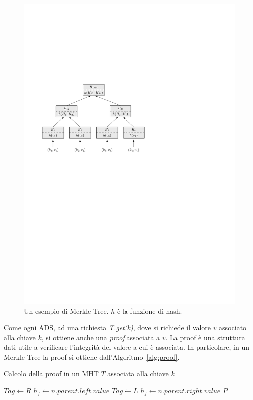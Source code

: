 \begin{figure}
	\centering
	\includegraphics{img/capuno/mht.pdf}
	\caption{Un esempio di Merkle Tree. $h$ è la funzione di hash.}
	\label{fig:mht}
\end{figure}

Come ogni ADS, ad una richiesta \emph{T.get(k)}, dove si richiede il valore $v$ associato alla chiave $k$, si ottiene anche una \emph{proof} associata a $v$. La proof è una struttura dati utile a verificare l'integrità del valore a cui è associata. In particolare, in un Merkle Tree la proof si ottiene dall'Algoritmo~\ref{alg:proof}.

\begin{algorithm}
	\caption{Calcolo della proof in un MHT $T$ associata alla chiave $k$}
	\begin{algorithmic}
					
					\State $Tag \leftarrow R$
					\State $h_f \leftarrow n.parent.left.value$
				\Else										{}
					\State $Tag \leftarrow L$
					\State $h_f \leftarrow n.parent.right.value$
				\EndIf
			\EndWhile
			\Return $P$
		\EndProcedure
	\end{algorithmic}
	\label{alg:proof}
\end{algorithm}

